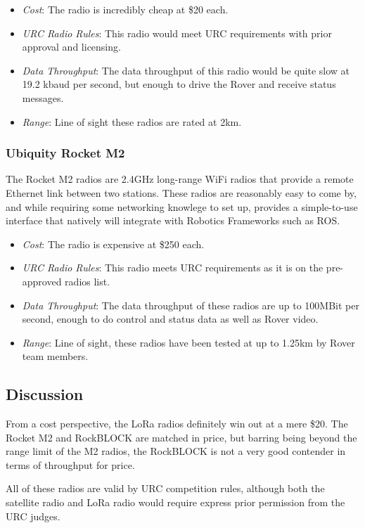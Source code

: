 \documentclass[onecolumn, draftclsnofoot, 10pt, compsoc]{IEEEtran}
\begin{document}
\begin{itemize}
\item \textit{Cost}: The radio is incredibly cheap at \$20 each.
\item \textit{URC Radio Rules}: This radio would meet URC requirements with prior approval and licensing.
\item \textit{Data Throughput}: The data throughput of this radio would be quite slow at 19.2 kbaud per second, but enough to drive the Rover and receive status messages.
\item \textit{Range}: Line of sight these radios are rated at 2km.
\end{itemize}

\subsubsection{Ubiquity Rocket M2}
The Rocket M2 radios are 2.4GHz long-range WiFi radios that provide a remote Ethernet link between two stations. These radios are reasonably easy to come by, and while requiring some networking knowlege to set up, provides a simple-to-use interface that natively will integrate with Robotics Frameworks such as ROS.

\begin{itemize}
\item \textit{Cost}: The radio is expensive at \$250 each.
\item \textit{URC Radio Rules}: This radio meets URC requirements as it is on the pre-approved radios list.
\item \textit{Data Throughput}: The data throughput of these radios are up to 100MBit per second, enough to do control and status data as well as Rover video.
\item \textit{Range}: Line of sight, these radios have been tested at up to 1.25km by Rover team members.
\end{itemize}

\subsection{Discussion}
From a cost perspective, the LoRa radios definitely win out at a mere \$20. 
The Rocket M2 and RockBLOCK are matched in price, but barring being beyond the range limit of the M2 radios, the RockBLOCK is not a very good contender in terms of throughput for price.

All of these radios are valid by URC competition rules, although both the satellite radio and LoRa radio would require express prior permission from the URC judges.
\end{document}
